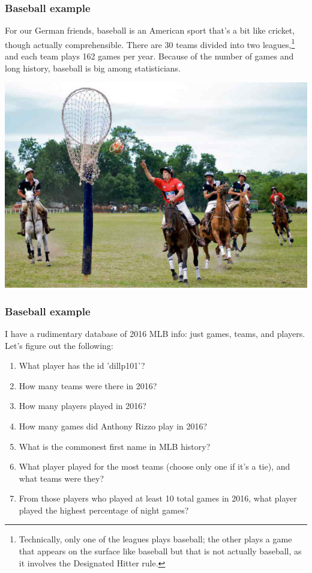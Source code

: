 \documentclass[aspectratio=169]{beamer}
\begin{document}
\begin{frame}[fragile]
  \frametitle{Baseball example}

  For our German friends, baseball is an American sport that's a bit like
  cricket, though actually comprehensible. There are 30 teams divided into
  two leagues,\footnote{Technically, only one of the leagues plays baseball;
    the other plays a game that appears on the surface like baseball but that
    is not actually baseball, as it involves the Designated Hitter rule.} and
  each team plays 162 games per year. Because of the number of games and
  long history, baseball is big among statisticians.
  \begin{center}
    \includegraphics[width=0.5\textheight]{Pato.jpg}
  \end{center}
\end{frame}


\begin{frame}[fragile]
  \frametitle{Baseball example}

  I have a rudimentary database of 2016 MLB info: just games, teams, and
  players. Let's figure out the following:

  \begin{enumerate}
    \item What player has the id 'dillp101'?\label{pickles}
    \item How many teams were there in 2016?\label{num_teams}
    \item How many players played in 2016?\label{num_players}
    \item How many games did Anthony Rizzo play in 2016?\label{rizzo}
    \item What is the commonest first name in MLB history?\label{common}
    \item What player played for the most teams (choose only one if it's a
          tie), and what teams were they?\label{most_teams}
    \item From those players who played at least 10 total games in 2016, what
          player played the highest percentage of night games?\label{night}
  \end{enumerate}
\end{frame}
\end{document}
